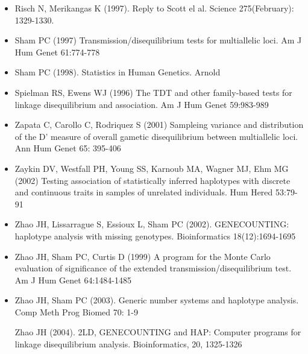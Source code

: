 \documentclass[10pt,a4paper]{article}
\begin{document}
\begin{itemize}
\item[] 
Risch N, Merikangas K (1997). Reply to Scott el al. Science
275(February): 1329-1330. 

\item[] 
Sham PC (1997) Transmission/disequilibrium tests for multiallelic loci.
Am J Hum Genet 61:774-778

\item[] 
Sham PC (1998). Statistics in Human Genetics. Arnold

\item[] 
Spielman RS, Ewens WJ (1996) The TDT and other family-based tests for
linkage disequilibrium and association. Am J Hum Genet 59:983-989

\item[] 
Zapata C, Carollo C, Rodriquez S (2001) Sampleing variance and distribution
of the D' measure of overall gametic disequilibrium between multiallelic loci.
Ann Hum Genet 65: 395-406

\item[] 
Zaykin DV, Westfall PH, Young SS, Karnoub MA, Wagner MJ, Ehm MG (2002)
Testing association of statistically inferred haplotypes with discrete
and continuous traits in samples of unrelated individuals. Hum
Hered 53:79-91

\item[] 
Zhao JH, Lissarrague S, Essioux L, Sham PC (2002).
GENECOUNTING: haplotype analysis with missing genotypes.
Bioinformatics 18(12):1694-1695
 
\item[] 
Zhao JH, Sham PC, Curtis D (1999) A program for the Monte Carlo evaluation
of significance of the extended transmission/disequilibrium test.
Am J Hum Genet 64:1484-1485

\item[] 
Zhao JH, Sham PC (2003). Generic number systems and haplotype
analysis. Comp Meth Prog Biomed 70: 1-9

Zhao JH (2004). 2LD, GENECOUNTING and HAP: Computer programs for linkage
disequilibrium analysis. Bioinformatics, 20, 1325-1326 

\end{itemize}
\end{document}
